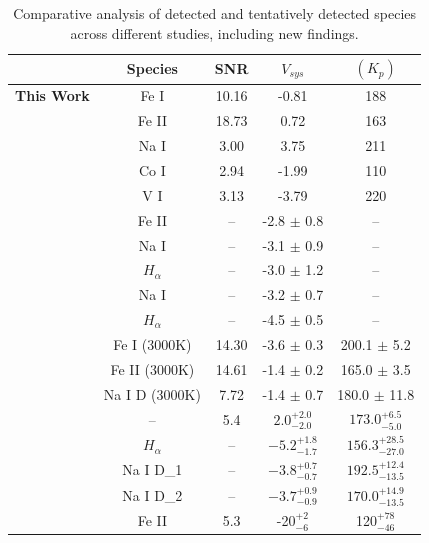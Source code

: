 \documentclass[twocolumn]{aastex631}
\begin{document}
    \begin{table}
        \centering
        \caption{Comparative analysis of detected and tentatively detected species across different studies, including new findings.}
        
        {\footnotesize %
        \setlength\tabcolsep{4pt} %
        \begin{tabular}{lcccc}
        \hline
         & Species & SNR & $V_{sys}$ & $(K_p)$ \\
        \hline
        \textbf{This Work} & Fe I & 10.16 & -0.81 & 188 \\
        & Fe II & 18.73 & 0.72 & 163 \\
        & Na I & 3.00 & 3.75 & 211 \\
        & Co I & 2.94 & -1.99 & 110 \\
        & V I & 3.13 & -3.79 & 220 \\
        \citep{CasasayasBarris2020} & Fe II & -- & -2.8 $\pm$ 0.8 & -- \\
        & Na I & -- & -3.1 $\pm$ 0.9 & -- \\
        & $H_{\alpha}$ & -- & -3.0 $\pm$ 1.2 & -- \\
        \citep{Hoeijmakers2020} & Na I & -- & -3.2 $\pm$ 0.7 & -- \\
        & $H_{\alpha}$ & -- & -4.5 $\pm$ 0.5 & -- \\
        \citep{Nugroho2020} & Fe I (3000K) & 14.30 & -3.6  $\pm$ 0.3 & 200.1 $\pm$ 5.2 \\
        & Fe II (3000K) & 14.61 & -1.4 $\pm$ 0.2 & 165.0 $\pm$ 3.5 \\
        & Na I D (3000K) & 7.72 & -1.4 $\pm$ 0.7 & 180.0 $\pm$ 11.8 \\
        \citep{Kasper2022} & -- & 5.4 & $2.0^{+2.0}_{-2.0}$ & $173.0^{+6.5}_{-5.0}$ \\
        \citep{Sicilia2022} & $H_{\alpha}$ & -- & $-5.2^{+1.8}_{-1.7}$ & $156.3^{+28.5}_{-27.0}$ \\
        & Na I D_1 & -- & $-3.8^{+0.7}_{-0.7}$ & $192.5^{+12.4}_{-13.5}$ \\
        & Na I D_2 & -- & $-3.7^{+0.9}_{-0.9}$ & $170.0^{+14.9}_{-13.5}$ \\
        \citep{BelloArufe2022} & Fe II & 5.3 & -20$^{+2}_{-6}$ & 120$^{+78}_{-46}$ \\
        
        \hline
        \end{tabular}}
        \label{tab:results-summary}
    \end{table}
\end{document}
